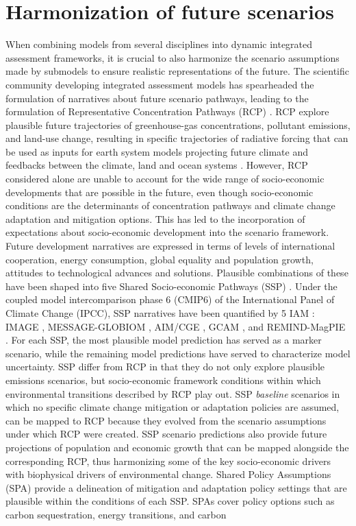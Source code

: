 \documentclass[titlesmallcaps,copyrightpage]{uomthesis}\usepackage[]{graphicx}\usepackage[]{color}
\begin{document}
\section{Harmonization of future scenarios}
When combining models from several disciplines into dynamic integrated assessment frameworks, it is crucial to also harmonize the scenario assumptions made by submodels to ensure realistic representations of the future. The scientific community developing integrated assessment models has spearheaded the formulation of narratives about future scenario pathways, leading to the formulation of Representative Concentration Pathways (RCP) \citep{van_vuuren_representative_2011}. RCP explore plausible future trajectories of greenhouse-gas concentrations, pollutant emissions, and land-use change, resulting in specific trajectories of radiative forcing that can be used as inputs for earth system models projecting future climate and feedbacks between the climate, land and ocean systems \citep{van_vuuren_representative_2011, oneill_mapping_2011}. However, RCP considered alone are unable to account for the wide range of socio-economic developments that are possible in the future, even though socio-economic conditions are the determinants of concentration pathways and climate change adaptation and mitigation options. This has led to the incorporation of expectations about socio-economic development into the scenario framework. Future development narratives are expressed in terms of levels of international cooperation, energy consumption, global equality and population growth, attitudes to technological advances and solutions. Plausible combinations of these have been shaped into five Shared Socio-economic Pathways (SSP) \citep{oneill_new_2014}. Under the coupled model intercomparison phase 6 (CMIP6) of the International Panel of Climate Change (IPCC), SSP narratives have been quantified by 5 IAM \citep{riahi_shared_2017}: IMAGE \citep[SSP1,][]{van_vuuren_energy_2017}, MESSAGE-GLOBIOM \citep[SSP2,][]{fricko_marker_2017}, AIM/CGE \citep[SSP3,][]{fujimori_ssp3_2017}, GCAM \citep[SSP4,][]{calvin_ssp4_2017}, and REMIND-MagPIE \citep[SSP5,][]{kriegler_fossil-fueled_2017}. For each SSP, the most plausible model prediction has served as a marker scenario, while the remaining model predictions have served to characterize model uncertainty. SSP differ from RCP in that they do not only explore plausible emissions scenarios, but socio-economic framework conditions within which environmental transitions described by RCP play out. SSP \textit{baseline} scenarios in which no specific climate change mitigation or adaptation policies are assumed, can be mapped to RCP because they evolved from the scenario assumptions under which RCP were created. SSP scenario predictions also provide future projections of population and economic growth that can be mapped alongside the corresponding RCP, thus harmonizing some of the key socio-economic drivers with biophysical drivers of environmental change. Shared Policy Assumptions (SPA) \citep{kriegler_new_2014} provide a delineation of mitigation and adaptation policy settings that are plausible within the conditions of each SSP. SPAs cover policy options such as carbon sequestration, energy transitions, and carbon 
\end{document}
